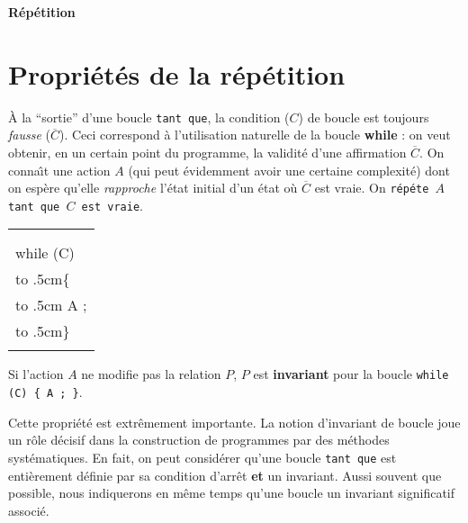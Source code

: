 \label{Repetition}
\centerline{\Large\bf R\'ep\'etition}

 
 \noindent\hrulefill  

\section*{Propri\'et\'es de la r\'ep\'etition}



\`A la ``sortie'' d'une boucle {\tt tant que}, la condition ($C$) de
boucle est toujours {\em fausse} ($\overline{C}$).
Ceci correspond \`a l'utilisation naturelle
de la boucle {\bf while } :
on veut obtenir, en un certain point du
programme, la validit\'e d'une affirmation $\overline{C}$.
On conna\^\i t une action {\tt $A$} (qui
peut \'evidemment avoir une certaine complexit\'e)
dont on esp\`ere qu'elle {\em rapproche}
l'\'etat initial
d'un \'etat o\`u $\overline{C}$ est vraie.
 On {\tt r\'ep\'ete $A$ tant que $C$ est vraie}.

\begin{floatingtable}{ 
\begin{tabular}{|l|}
\hline
\\
\begin{minipage}[t]{3cm}
{\tt
$/* P$ et $C */$\\
while (C)\\
\hbox to .5cm{}\{\\
\hbox to .5cm{} A ;\\
\hbox to .5cm{}\}\\
}
$/* P$ et $\overline{C} */$
\end{minipage} \\
\hline
\end{tabular}}\end{floatingtable}
Si l'action $A$ ne modifie pas la relation $P$, $P$ est 
{\bf invariant} pour la  boucle {\tt while (C) \{ A ; \}}.

Cette propri\'et\'e est extr\^emement importante.
La notion d'invariant de boucle joue un r\^ole d\'ecisif dans la construction de
programmes par des m\'ethodes syst\'ematiques.
En fait, on peut consid\'erer qu'une
boucle {\tt tant que} est enti\`e\-re\-ment d\'efinie par sa condition d'arr\^et
{\bf et} un invariant.
Aussi souvent que possible, nous indiquerons en m\^eme temps qu'une
boucle un invariant significatif associ\'e.

